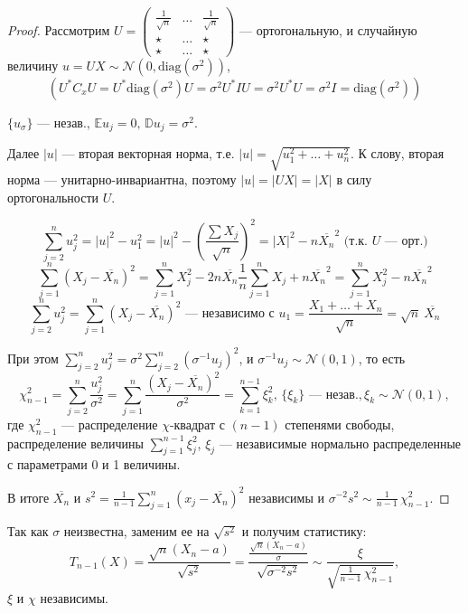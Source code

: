 \begin{enumerate}
\begin{proof}
		Рассмотрим $U = \left(\begin{matrix} \frac1{\sqrt{n}} & \dots & \frac1{\sqrt{n}} \\[-0 pt] \star & \dots & \star \\[-0 pt] \star & \dots & \star \end{matrix}\right)$ --- ортогональную, и случайную величину $u = UX \sim \mathcal{N}(0, \text{diag}(\sigma^2))$, 
		\[ \left( U^{*} C_x U = U^{*}\text{diag}(\sigma^2)U = \sigma^2 U^{*} I U = \sigma^2 U^{*} U = \sigma^2 I = \text{diag}(\sigma^2) \right) \]
		
		$\{ u_{\sigma} \}$ --- незав., $\mathbb{E} u_j = 0, \, \mathbb{D} u_j = \sigma^2$.
		
		Далее $|u|$ --- вторая векторная норма, т.е. $|u| = \sqrt{u_1^2 + \ldots + u_n^2}$. К слову, вторая норма --- унитарно-инвариантна, поэтому $|u| = |UX| = |X|$ в силу ортогональности $U$.
		
		\[ \sum_{j=2}^n u_j^2 = |u|^2 - u_1^2 = |u|^2 - \left( \frac{\sum X_j}{\sqrt{n}} \right)^2 = |X|^2 - n\overline{X_n}^2 \text{ (т.к. $U$ --- орт.)} \]
		\[ \sum_{j=1}^n (X_j - \overline{X_n})^2 = \sum_{j=1}^n X_j^2 - 2n \overline{X_n} \frac{1}{n} \sum_{j=1}^n X_j + n\overline{X_n}^2 = \sum_{j=1}^n X_j^2 - n\overline{X_n}^2 \]
		\[ \sum_{j=2}^n u_j^2 = \sum_{j=1}^n (X_j - \overline{X_n})^2 \text{ --- независимо с } u_1 = \frac{X_1 + \ldots + X_n}{\sqrt{n}} = \sqrt{n}\ \overline{X_n} \]
		
		При этом $\sum_{j=2}^n u_j^2 = \sigma^2 \sum_{j=2}^n (\sigma^{-1} u_j)^2$, и $\sigma^{-1} u_j \sim \mathcal{N}(0, 1)$, то есть
        \[ \chi_{n-1}^2 = \sum_{j=2}^n \frac{u_j^2}{\sigma^2} = \sum_{j=1}^{n} \frac{(X_j - \overline{X_n})^2}{\sigma^2} = \sum_{k=1}^{n-1} \xi_k^2, \, \{ \xi_k \} \text{ --- незав.}, \xi_k \sim \mathcal{N}(0, 1), \]
        где $\chi_{n-1}^2$ --- распределение $\chi$-квадрат с $(n-1)$ степенями свободы, распределение величины $\sum_{j=1}^{n-1} \xi_j^2$, $\xi_j$ --- независимые нормально распределенные с параметрами 0 и 1 величины.
		
		В итоге $\overline{X_n}$ и $s^2 = \frac1{n-1} \sum_{j=1}^n (x_j - \overline{X_n})^2$ независимы и $\sigma^{-2}s^2 \sim \frac1{n-1}\,\chi_{n-1}^2$.
	\end{proof}
	
	Так как $\sigma$ неизвестна, заменим ее на $\sqrt{s^2}$ и получим статистику:
    \[ T_{n-1}(X) = \frac{\sqrt{n}(X_n - a)}{\sqrt{s^2}} = \frac{\frac{\sqrt{n}(X_n - a)}{\sigma}}{\sqrt{\sigma^{-2} s^2}} \sim \frac{\xi}{\sqrt{\frac1{n-1}\,\chi^2_{n-1}}}, \]
	$\xi$ и $\chi$ независимы.
	

\end{enumerate}

